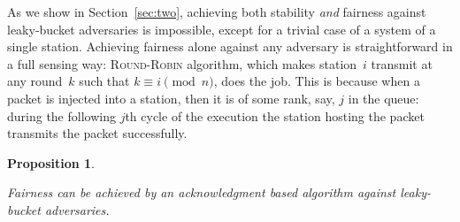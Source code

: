 \documentclass[11pt]{article}
\newtheorem{proposition}{Proposition}
\begin{document}
As we show in Section~\ref{sec:two}, achieving both stability \emph{and} fairness against leaky-bucket adversaries is impossible, except for a trivial case of a system of a single station.
Achieving fairness alone against any adversary is straightforward in a full sensing way:
\textsc{Round-Robin} algorithm, which makes station~$i$ transmit at any round~$k$ such that $k \equiv i \pmod n$, does the job.
This is because when a packet is injected into a station, then it is of some rank, say, $j$ in the queue: during the following $j$th cycle of the execution the station hosting the packet transmits the packet successfully.




\begin{proposition}
\label{prop:fairness-ack-based}

Fairness can be achieved by an acknowledgment based algorithm against leaky-bucket adversaries.
\end{proposition}
\end{document}
